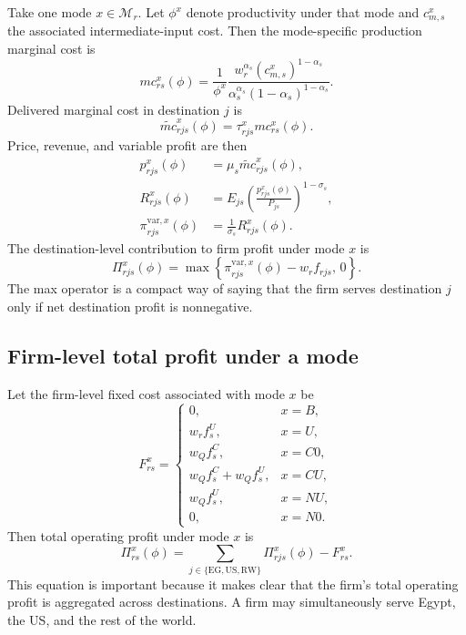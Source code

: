 \documentclass[11pt]{article}
\begin{document}
Take one mode \(x\in\mathcal{M}_r\). Let \(\phi^x\) denote productivity under that mode and \(c^x_{m,s}\) the associated intermediate-input cost. Then the mode-specific production marginal cost is
\begin{equation}
mc^x_{rs}(\phi)=\frac{1}{\phi^x}\frac{w_r^{\alpha_s}(c^x_{m,s})^{1-\alpha_s}}{\alpha_s^{\alpha_s}(1-\alpha_s)^{1-\alpha_s}}.
\end{equation}
Delivered marginal cost in destination \(j\) is
\begin{equation}
\widetilde{mc}^x_{rjs}(\phi)=\tau^x_{rjs}mc^x_{rs}(\phi).
\end{equation}
Price, revenue, and variable profit are then
\begin{align}
p^x_{rjs}(\phi)&=\mu_s\widetilde{mc}^x_{rjs}(\phi),\\
R^x_{rjs}(\phi)&=E_{js}\left(\frac{p^x_{rjs}(\phi)}{P_{js}}\right)^{1-\sigma_s},\\
\pi_{rjs}^{\mathrm{var},x}(\phi)&=\frac{1}{\sigma_s}R^x_{rjs}(\phi).
\end{align}
The destination-level contribution to firm profit under mode \(x\) is
\begin{equation}
\Pi^x_{rjs}(\phi)=\max\left\{\pi^{\mathrm{var},x}_{rjs}(\phi)-w_rf_{rjs},\,0\right\}.
\label{eq:destination_contribution_mode}
\end{equation}
The max operator is a compact way of saying that the firm serves destination \(j\) only if net destination profit is nonnegative.

\subsection{Firm-level total profit under a mode}

Let the firm-level fixed cost associated with mode \(x\) be
\begin{equation}
F^x_{rs}=
\begin{cases}
0, & x=B,\\
w_rf_s^U, & x=U,\\
w_Qf_s^C, & x=C0,\\
w_Qf_s^C+w_Qf_s^U, & x=CU,\\
w_Qf_s^U, & x=NU,\\
0, & x=N0.
\end{cases}
\end{equation}
Then total operating profit under mode \(x\) is
\begin{equation}
\Pi^x_{rs}(\phi)=\sum_{j\in\{\mathrm{EG},\mathrm{US},\mathrm{RW}\}}\Pi^x_{rjs}(\phi)-F^x_{rs}.
\label{eq:mode_profit_final}
\end{equation}
This equation is important because it makes clear that the firm's total operating profit is aggregated across destinations. A firm may simultaneously serve Egypt, the US, and the rest of the world.
\end{document}
